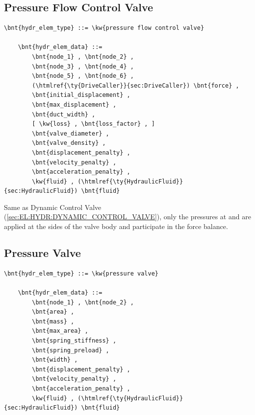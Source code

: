 \subsection{Pressure Flow Control Valve}
\label{sec:EL:HYDR:PRESSURE_FLOW_CONTROL_VALVE}
\begin{Verbatim}[commandchars=\\\{\}]
    \bnt{hydr_elem_type} ::= \kw{pressure flow control valve}

    \bnt{hydr_elem_data} ::=
        \bnt{node_1} , \bnt{node_2} ,
        \bnt{node_3} , \bnt{node_4} ,
        \bnt{node_5} , \bnt{node_6} ,
        (\htmlref{\ty{DriveCaller}}{sec:DriveCaller}) \bnt{force} ,
        \bnt{initial_displacement} ,
        \bnt{max_displacement} ,
        \bnt{duct_width} ,
        [ \kw{loss} , \bnt{loss_factor} , ]
        \bnt{valve_diameter} ,
        \bnt{valve_density} ,
        \bnt{displacement_penalty} ,
        \bnt{velocity_penalty} ,
        \bnt{acceleration_penalty} ,
        \kw{fluid} , (\htmlref{\ty{HydraulicFluid}}{sec:HydraulicFluid}) \bnt{fluid}
\end{Verbatim}
Same as Dynamic Control Valve (\ref{sec:EL:HYDR:DYNAMIC_CONTROL_VALVE}),
only the pressures at  and  are applied
at the sides of the valve body and participate in the force balance.



\subsection{Pressure Valve}
\label{sec:EL:HYDR:PRESSURE_VALVE}
\begin{Verbatim}[commandchars=\\\{\}]
    \bnt{hydr_elem_type} ::= \kw{pressure valve}

    \bnt{hydr_elem_data} ::=
        \bnt{node_1} , \bnt{node_2} ,
        \bnt{area} ,
        \bnt{mass} ,
        \bnt{max_area} ,
        \bnt{spring_stiffness} ,
        \bnt{spring_preload} ,
        \bnt{width} ,
        \bnt{displacement_penalty} ,
        \bnt{velocity_penalty} ,
        \bnt{acceleration_penalty} ,
        \kw{fluid} , (\htmlref{\ty{HydraulicFluid}}{sec:HydraulicFluid}) \bnt{fluid}
\end{Verbatim}

